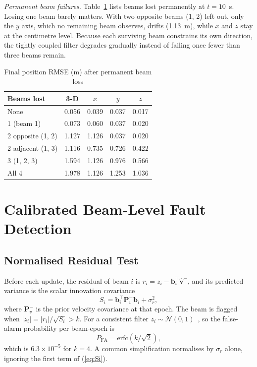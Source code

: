 \documentclass[conference]{IEEEtran}
\newcommand{\vect}[1]{\mathbf{#1}}
\begin{document}
\emph{Permanent beam failures.} Table~\ref{tab:c3} lists beams lost permanently at $t=10$~s. Losing one beam barely matters. With two opposite beams (1, 2) left out, only the $y$ axis, which no remaining beam observes, drifts (1.13~m), while $x$ and $z$ stay at the centimetre level. Because each surviving beam constrains its own direction, the tightly coupled filter degrades gradually instead of failing once fewer than three beams remain.

\begin{table}[t]
\centering
\caption{Final position RMSE (m) after permanent beam loss}
\label{tab:c3}
\begin{tabular}{lcccc}
\toprule
Beams lost & 3-D & $x$ & $y$ & $z$\\
\midrule
None & 0.056 & 0.039 & 0.037 & 0.017\\
1 (beam 1) & 0.073 & 0.060 & 0.037 & 0.020\\
2 opposite (1, 2) & 1.127 & 1.126 & 0.037 & 0.020\\
2 adjacent (1, 3) & 1.116 & 0.735 & 0.726 & 0.422\\
3 (1, 2, 3) & 1.594 & 1.126 & 0.976 & 0.566\\
All 4 & 1.978 & 1.126 & 1.253 & 1.036\\
\bottomrule
\end{tabular}
\end{table}

\section{Calibrated Beam-Level Fault Detection}
\label{sec:fdi}

\subsection{Normalised Residual Test}

Before each update, the residual of beam $i$ is $r_i=z_i-\vect b_i^\top\hat{\vect v}^-$, and its predicted variance is the scalar innovation covariance
\begin{equation}
S_i=\vect b_i^\top\vect P_v^-\vect b_i+\sigma_r^2 ,
\label{eq:Si}
\end{equation}
where $\vect P_v^-$ is the prior velocity covariance at that epoch. The beam is flagged when $|z_i|=|r_i|/\sqrt{S_i}>k$. For a consistent filter $z_i\sim\mathcal N(0,1)$~\cite{barshalom2001}, so the false-alarm probability per beam-epoch is
\begin{equation}
P_{\mathrm{FA}}=\mathrm{erfc}\!\left(k/\sqrt2\right),
\end{equation}
which is $6.3\times10^{-5}$ for $k=4$. A common simplification normalises by $\sigma_r$ alone, ignoring the first term of (\ref{eq:Si}).
\end{document}
